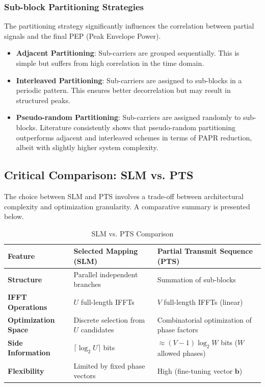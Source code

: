 \documentclass[journal]{IEEEtran}
\begin{document}
\subsubsection{Sub-block Partitioning Strategies}
The partitioning strategy significantly influences the correlation between partial signals and the final PEP (Peak Envelope Power).

\begin{itemize}
    \item \textbf{Adjacent Partitioning}: Sub-carriers are grouped sequentially. This is simple but suffers from high correlation in the time domain.
    \item \textbf{Interleaved Partitioning}: Sub-carriers are assigned to sub-blocks in a periodic pattern. This ensures better decorrelation but may result in structured peaks.
    \item \textbf{Pseudo-random Partitioning}: Sub-carriers are assigned randomly to sub-blocks. Literature consistently shows that pseudo-random partitioning outperforms adjacent and interleaved schemes in terms of PAPR reduction, albeit with slightly higher system complexity.
\end{itemize}

\subsection{Critical Comparison: SLM vs. PTS}
The choice between SLM and PTS involves a trade-off between architectural complexity and optimization granularity. A comparative summary is presented below.

\begin{table}[htbp]
    \caption{SLM vs. PTS Comparison}
    \begin{center}
        \begin{tabular}{|l|p{3.5cm}|p{3.5cm}|}
            \hline
            \textbf{Feature}            & \textbf{Selected Mapping (SLM)}        & \textbf{Partial Transmit Sequence (PTS)}          \\ \hline
            \textbf{Structure}          & Parallel independent branches          & Summation of sub-blocks                           \\ \hline
            \textbf{IFFT Operations}    & $U$ full-length IFFTs                  & $V$ full-length IFFTs (linear)                    \\ \hline
            \textbf{Optimization Space} & Discrete selection from $U$ candidates & Combinatorial optimization of phase factors       \\ \hline
            \textbf{Side Information}   & $\lceil \log_2 U \rceil$ bits          & $\approx (V-1)\log_2 W$ bits ($W$ allowed phases) \\ \hline
            \textbf{Flexibility}        & Limited by fixed phase vectors         & High (fine-tuning vector $\mathbf{b}$)            \\ \hline
        \end{tabular}
        \label{tab1}
    \end{center}
\end{table}
\end{document}
